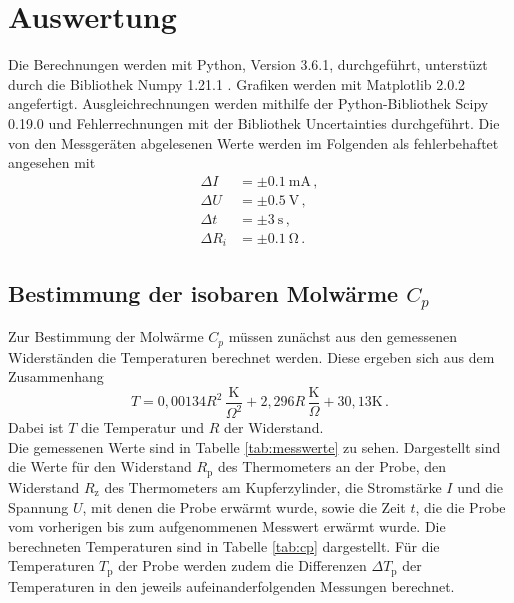 \section{Auswertung}
\label{sec:Auswertung}
Die Berechnungen werden mit Python, Version 3.6.1, durchgeführt, unterstüzt durch die Bibliothek Numpy 1.21.1 \cite{numpy}. Grafiken werden mit Matplotlib 2.0.2 \cite{matplotlib} angefertigt.
Ausgleichrechnungen werden mithilfe der Python-Bibliothek Scipy 0.19.0 \cite{scipy}
und Fehlerrechnungen mit der Bibliothek Uncertainties \cite{uncertainties} durchgeführt.
Die von den Messgeräten abgelesenen Werte werden im Folgenden als fehlerbehaftet angesehen mit
\begin{align*}
  \Delta I &= \pm \SI{0.1}{\milli\ampere}\,, \\
  \Delta U &= \pm \SI{0.5}{\volt}\,, \\
  \Delta t &= \pm \SI{3}{\second}\,, \\
  \Delta R_i &= \pm \SI{0.1}{\ohm}\,.
\end{align*}

\subsection{Bestimmung der isobaren Molwärme $C_p$}
\label{subsec:cp}
Zur Bestimmung der Molwärme $C_p$ müssen zunächst aus den gemessenen
Widerständen die Temperaturen berechnet werden. Diese ergeben sich aus dem
Zusammenhang
\begin{equation*}
  T=0,00134R^2\,\frac{\text{K}}{\Omega^2}+2,296R\,\frac{\text{K}}{\Omega}+30,13\text{K} \,.
\end{equation*}
Dabei ist $T$ die Temperatur und $R$ der Widerstand.\\
Die gemessenen Werte sind in Tabelle \ref{tab:messwerte} zu sehen.
Dargestellt sind die Werte für den Widerstand $R_\text{p}$ des Thermometers an der Probe,
den Widerstand $R_\text{z}$ des Thermometers am Kupferzylinder, die Stromstärke $I$ und
die Spannung $U$, mit denen die Probe erwärmt wurde, sowie die Zeit $t$,
die die Probe vom vorherigen bis zum aufgenommenen Messwert erwärmt wurde.
Die berechneten Temperaturen sind in Tabelle \ref{tab:cp} dargestellt. Für die
Temperaturen $T_\text{p}$ der Probe werden zudem die Differenzen $\Delta T_\text{p}$ der Temperaturen
in den jeweils aufeinanderfolgenden Messungen berechnet.

